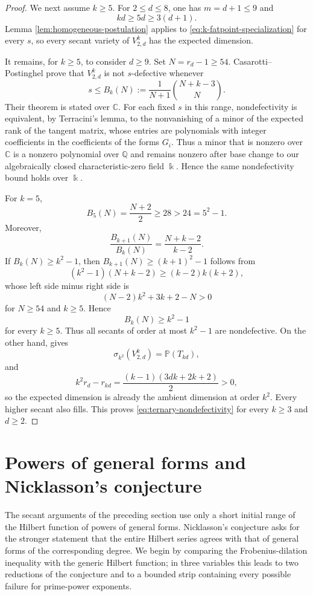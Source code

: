 \documentclass[11pt]{amsart}
\theoremstyle{remark}
\newcommand{\PP}{\mathbb P}
\newcommand{\kk}{\Bbbk}
\begin{document}
\begin{proof}
We next assume $k\ge5$. For $2\le d\le8$, one has $m=d+1\le9$ and
$$
kd\ge5d\ge3(d+1).
$$
Lemma \ref{lem:homogeneous-postulation} applies to \eqref{eq:k-fatpoint-specialization} for every $s$, so every secant variety of $V^k_{2,d}$ has the expected dimension.

It remains, for $k\ge5$, to consider $d\ge9$. Set $N=r_d-1\ge54$. Casarotti--Postinghel \cite[Theorem~1.1]{CasarottiPostinghel} prove that $V^k_{2,d}$ is not $s$-defective whenever
\begin{equation}\label{eq:CP-bound}
s\le B_k(N):=\frac1{N+1}\binom{N+k-3}{N}.
\end{equation}
Their theorem is stated over $\mathbb C$. For each fixed $s$ in this range, nondefectivity is equivalent, by Terracini's lemma, to the nonvanishing of a minor of the expected rank of the tangent matrix, whose entries are polynomials with integer coefficients in the coefficients of the forms $G_i$. Thus a minor that is nonzero over $\mathbb C$ is a nonzero polynomial over $\mathbb Q$ and remains nonzero after base change to our algebraically closed characteristic-zero field $\kk$. Hence the same nondefectivity bound holds over $\kk$.

For $k=5$,
$$
B_5(N)=\frac{N+2}{2}\ge28>24=5^2-1.
$$
Moreover,
$$
\frac{B_{k+1}(N)}{B_k(N)}=\frac{N+k-2}{k-2}.
$$
If $B_k(N)\ge k^2-1$, then $B_{k+1}(N)\ge(k+1)^2-1$ follows from
$$
(k^2-1)(N+k-2)\ge(k-2)k(k+2),
$$
whose left side minus right side is
$$
(N-2)k^2+3k+2-N>0
$$
for $N\ge54$ and $k\ge5$. Hence
$$
B_k(N)\ge k^2-1
$$
for every $k\ge5$. Thus all secants of order at most $k^2-1$ are nondefective. On the other hand, \cite[Theorem~4]{FOS} gives
$$
\sigma_{k^2}(V^k_{2,d})=\PP(T_{kd}),
$$
and
$$
k^2r_d-r_{kd}
=
\frac{(k-1)(3dk+2k+2)}2>0,
$$
so the expected dimension is already the ambient dimension at order $k^2$. Every higher secant also fills. This proves \eqref{eq:ternary-nondefectivity} for every $k\ge3$ and $d\ge2$.
\end{proof}

\section{Powers of general forms and Nicklasson's conjecture}\label{sec:Nicklasson-general}

The secant arguments of the preceding section use only a short initial range of the Hilbert function of powers of general forms. Nicklasson's conjecture asks for the stronger statement that the entire Hilbert series agrees with that of general forms of the corresponding degree. We begin by comparing the Frobenius-dilation inequality with the generic Hilbert function; in three variables this leads to two reductions of the conjecture and to a bounded strip containing every possible failure for prime-power exponents.
\end{document}
